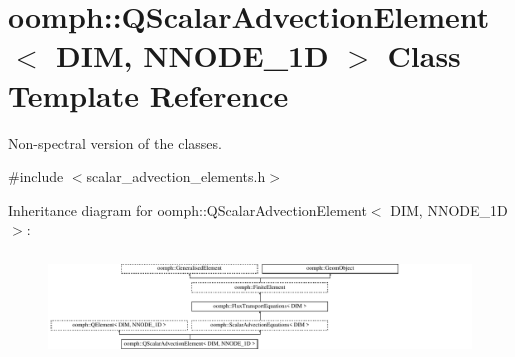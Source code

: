 \hypertarget{classoomph_1_1QScalarAdvectionElement}{}\section{oomph\+:\+:Q\+Scalar\+Advection\+Element$<$ D\+IM, N\+N\+O\+D\+E\+\_\+1D $>$ Class Template Reference}
\label{classoomph_1_1QScalarAdvectionElement}


Non-\/spectral version of the classes.  




{\ttfamily \#include $<$scalar\+\_\+advection\+\_\+elements.\+h$>$}

Inheritance diagram for oomph\+:\+:Q\+Scalar\+Advection\+Element$<$ D\+IM, N\+N\+O\+D\+E\+\_\+1D $>$\+:\begin{figure}[H]
\begin{center}
\leavevmode
\includegraphics[height=2.786069cm]{classoomph_1_1QScalarAdvectionElement}
\end{center}
\end{figure}
